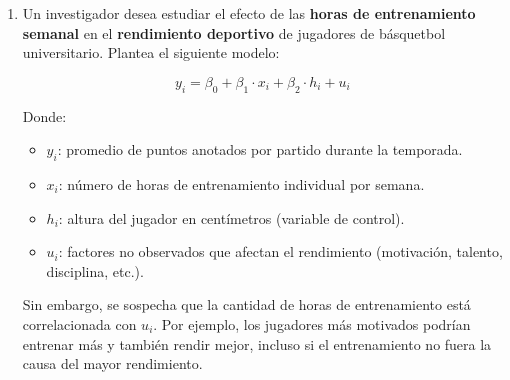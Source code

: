 \documentclass[10pt,a4paper]{article}
\begin{document}
\begin{enumerate}
{\begin{itemize}
    \item Sin tendencia: Estadístico t para \( y_{t-1} \) = $-1{,}876$
    \item Con tendencia: Estadístico t para \( y_{t-1} \) = $-1{,}6889$
\end{itemize}


Se utiliza el valor del estadístico t del modelo con tendencia: $-1{,}6889$.\\

La serie tiene una frecuencia mensual desde enero de 1983 a diciembre de 2024  con un total de 504 observaciones.

Se deben utilizar los valores críticos de la tabla para T=500:

\begin{itemize}
    \item 1\%: $-3{,}98$
    \item 5\%: $-3{,}42$
\end{itemize}

Comparación: \(-1{,}6889 > -3{,}98\) → No se rechaza \( H_0 \)  al 1\%.\\

La evidencia no permite rechazar la presencia de raíz unitaria. La serie es no estacionaria y sigue una caminata aleatoria con tendencia estocástica.
}

 \item Un investigador desea estudiar el efecto de las \textbf{horas de entrenamiento semanal} en el \textbf{rendimiento deportivo} de jugadores de básquetbol universitario. Plantea el siguiente modelo:

 
\[
y_i = \beta_0 + \beta_1 \cdot x_i + \beta_2 \cdot h_i + u_i
\]

Donde:
\begin{itemize}
    \item $y_i$: promedio de puntos anotados por partido durante la temporada.
    \item $x_i$: número de horas de entrenamiento individual por semana. 
    \item $h_i$: altura del jugador en centímetros (variable de control). 
    \item $u_i$: factores no observados que afectan el rendimiento (motivación, talento, disciplina, etc.).
\end{itemize}



Sin embargo, se sospecha que la cantidad de horas de entrenamiento está correlacionada con $u_i$. Por ejemplo, los jugadores más motivados podrían entrenar más y también rendir mejor, incluso si el entrenamiento no fuera la causa del mayor rendimiento.



\end{enumerate}
\end{document}
